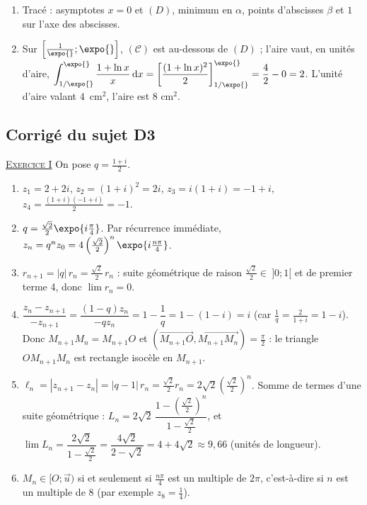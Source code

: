 \begin{corrige}
\begin{enumerate}
      une seule solution, qui est $1$. Sur $]0 ; \alpha]$, $f$ est strictement d\'ecroissante de $+\infty$ \`a $f(\alpha) < 0$ : une seule
      solution $\beta$. $f(0{,}4) \approx 0{,}4 - \frac{1 - 0{,}92}{0{,}4} = 0{,}2 > 0$ et $f(0{,}5) \approx 0{,}5 - \frac{1 - 0{,}69}{0{,}5} = -0{,}12 < 0$,
      donc $0{,}4 < \beta < 0{,}5$.
\item Trac\'e : asymptotes $x = 0$ et $(D)$, minimum en $\alpha$, points d'abscisses $\beta$ et $1$ sur l'axe des abscisses.
\item Sur $\left[\frac{1}{\expo{}} ; \expo{}\right]$, $(\mathscr{C})$ est au-dessous de $(D)$ ; l'aire vaut, en unit\'es d'aire,
      $\displaystyle\int_{1/\expo{}}^{\expo{}} \frac{1 + \ln x}{x}\,\mathrm{d}x = \left[\frac{(1 + \ln x)^2}{2}\right]_{1/\expo{}}^{\expo{}} = \frac{4}{2} - 0 = 2$.
      L'unit\'e d'aire valant $4$~cm$^2$, l'aire est $\boxed{8 \text{ cm}^2}$.
\end{enumerate}

\subsection{Corrig\'e du sujet D3}
\noindent \underline{\textsc{Exercice I}} \newline
On pose $q = \frac{1 + i}{2}$.
\begin{enumerate}
\item $z_1 = 2 + 2i$, $z_2 = (1 + i)^2 = 2i$, $z_3 = i(1 + i) = -1 + i$, $z_4 = \frac{(1+i)(-1+i)}{2} = -1$.
\item $q = \frac{\sqrt{2}}{2}\expo{i\frac{\pi}{4}}$. Par r\'ecurrence imm\'ediate, $z_n = q^n z_0 = 4\left(\frac{\sqrt{2}}{2}\right)^n \expo{i\frac{n\pi}{4}}$.
\item $r_{n+1} = |q|\,r_n = \frac{\sqrt{2}}{2}\, r_n$ : suite g\'eom\'etrique de raison $\frac{\sqrt{2}}{2} \in\ ]0 ; 1[$ et de premier terme 4,
      donc $\lim r_n = 0$.
\item $\dfrac{z_n - z_{n+1}}{-z_{n+1}} = \dfrac{(1 - q)z_n}{-q z_n} = 1 - \dfrac{1}{q} = 1 - (1 - i) = i$
      (car $\frac{1}{q} = \frac{2}{1 + i} = 1 - i$). Donc $M_{n+1}M_n = M_{n+1}O$ et $(\overrightarrow{M_{n+1}O}, \overrightarrow{M_{n+1}M_n}) = \frac{\pi}{2}$ :
      le triangle $OM_{n+1}M_n$ est rectangle isoc\`ele en $M_{n+1}$.
\item $\ell_n = |z_{n+1} - z_n| = |q - 1|\, r_n = \frac{\sqrt{2}}{2} r_n = 2\sqrt{2}\left(\frac{\sqrt{2}}{2}\right)^n$.
      Somme de termes d'une suite g\'eom\'etrique : $L_n = 2\sqrt{2}\, \dfrac{1 - \left(\frac{\sqrt{2}}{2}\right)^n}{1 - \frac{\sqrt{2}}{2}}$,
      et $\lim L_n = \dfrac{2\sqrt{2}}{1 - \frac{\sqrt{2}}{2}} = \dfrac{4\sqrt{2}}{2 - \sqrt{2}} = \boxed{4 + 4\sqrt{2}} \approx 9{,}66$ (unit\'es de longueur).
\item $M_n \in [O ; \vec{u})$ si et seulement si $\frac{n\pi}{4}$ est un multiple de $2\pi$, c'est-\`a-dire si $n$ est un multiple de $8$
      (par exemple $z_8 = \frac{1}{4}$).
\end{enumerate}


\end{corrige}
